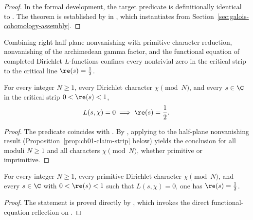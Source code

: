 \begin{proof}
In the formal development, the target predicate
 is definitionally identical to
.
The theorem is established by  in
, which instantiates
 from
Section~\ref{sec:galois-cohomology-assembly}.
\end{proof}

Combining right-half-plane nonvanishing with primitive-character reduction,
nonvanishing of the archimedean gamma factor, and the functional equation of
completed Dirichlet $L$-functions confines every nontrivial zero in the
critical strip to the critical line $\re(s) = \tfrac{1}{2}$.

\begin{theorem}
\label{thm:ch01-grh-all}
For every integer $N \ge 1$, every Dirichlet character $\chi \pmod{N}$, and
every $s \in \C$ in the critical strip $0 < \re(s) < 1$,
\[
  L(s, \chi) = 0 \implies \re(s) = \frac{1}{2}.
\]
\end{theorem}

\begin{proof}
The predicate  coincides with
.
By , applying  to the half-plane
nonvanishing result  (Proposition~\ref{prop:ch01-claim-strip}
below) yields the conclusion for all moduli $N \ge 1$ and all characters
$\chi \pmod{N}$, whether primitive or imprimitive.
\end{proof}

\begin{corollary}
\label{cor:ch01-grh-primitive}
For every integer $N \ge 1$, every primitive Dirichlet character
$\chi \pmod{N}$, and every $s \in \C$ with $0 < \re(s) < 1$ such that
$L(s, \chi) = 0$, one has $\re(s) = \tfrac{1}{2}$.
\end{corollary}

\begin{proof}
The statement  is proved directly by
, which invokes the direct functional-equation reflection
 on .
\end{proof}


